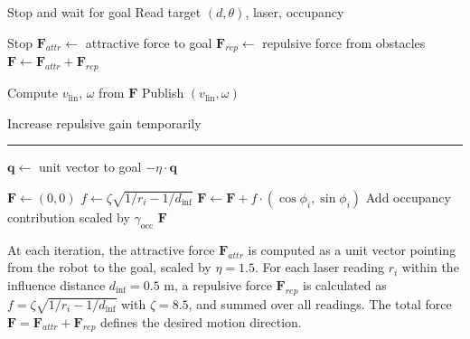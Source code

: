 \documentclass[robotics,article,submit,pdftex,moreauthors]{Definitions/mdpi}
\begin{document}
\begin{algorithm}
\caption{Pseudocode for the Potential Fields (PF) Baseline}
\label{alg:pf_reactive}
\begin{algorithmic}[1]


        \State Stop and wait for goal
    \Else
        \State Read target $(d, \theta)$, laser, occupancy

            \State Stop
        \Else
            \State $\mathbf{F}_{attr} \gets$ attractive force to goal
            \State $\mathbf{F}_{rep} \gets$ repulsive force from obstacles
            \State $\mathbf{F} \gets \mathbf{F}_{attr} + \mathbf{F}_{rep}$

            \State Compute $v_{\text{lin}}$, $\omega$ from $\mathbf{F}$
            \State Publish $(v_{\text{lin}}, \omega)$

                \State Increase repulsive gain temporarily
            \EndIf
        \EndIf
    \EndIf

\EndWhile

\vspace{0.2cm}
\hrule
\vspace{0.2cm}

    \State $\mathbf{q} \gets$ unit vector to goal
    \State \Return $-\eta \cdot \mathbf{q}$
\EndFunction

\vspace{0.2cm}

    \State $\mathbf{F} \gets (0,0)$
        \State $f \gets \zeta \sqrt{1/r_i - 1/d_{\text{inf}}}$
        \State $\mathbf{F} \gets \mathbf{F} + f \cdot (\cos\phi_i, \sin\phi_i)$
    \EndFor
    \State Add occupancy contribution scaled by $\gamma_{\text{occ}}$
    \State \Return $\mathbf{F}$
\EndFunction

\end{algorithmic}
\end{algorithm}

At each iteration, the attractive force $\mathbf{F}_{attr}$ is computed as a unit vector pointing from the robot to the goal, scaled by $\eta = 1.5$. For each laser reading $r_i$ within the influence distance $d_{\text{inf}} = 0.5$ m, a repulsive force $\mathbf{F}_{rep}$ is calculated as $f = \zeta \sqrt{1/r_i - 1/d_{\text{inf}}}$ with $\zeta = 8.5$, and summed over all readings. The total force $\mathbf{F} = \mathbf{F}_{attr} + \mathbf{F}_{rep}$ defines the desired motion direction.
\end{document}
